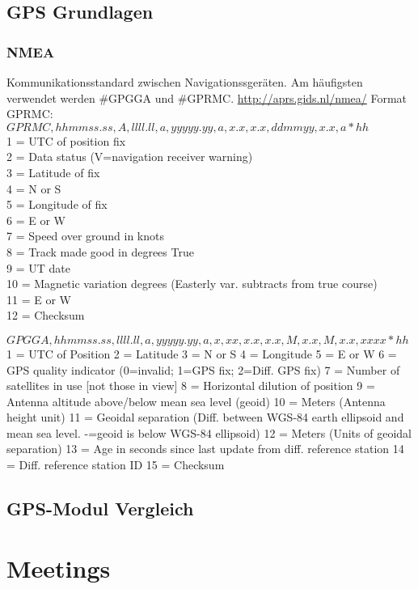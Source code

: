 \documentclass{article}
\begin{document}
\subsection{GPS Grundlagen}
\subsubsection{NMEA}

Kommunikationsstandard zwischen Navigationssgeräten. Am häufigsten verwendet werden $\#$GPGGA und $\#$GPRMC. \url{http://aprs.gids.nl/nmea/}
Format GPRMC:\\
$GPRMC,hhmmss.ss,A,llll.ll,a,yyyyy.yy,a,x.x,x.x,ddmmyy,x.x,a*hh$\\
1    = UTC of position fix\\
2    = Data status (V=navigation receiver warning)\\
3    = Latitude of fix\\
4    = N or S\\
5    = Longitude of fix\\
6    = E or W\\
7    = Speed over ground in knots\\
8    = Track made good in degrees True\\
9    = UT date\\
10   = Magnetic variation degrees (Easterly var. subtracts from true course)\\
11   = E or W\\
12   = Checksum



$GPGGA,hhmmss.ss,llll.ll,a,yyyyy.yy,a,x,xx,x.x,x.x,M,x.x,M,x.x,xxxx*hh$
1    = UTC of Position
2    = Latitude
3    = N or S
4    = Longitude
5    = E or W
6    = GPS quality indicator (0=invalid; 1=GPS fix; 2=Diff. GPS fix)
7    = Number of satellites in use [not those in view]
8    = Horizontal dilution of position
9    = Antenna altitude above/below mean sea level (geoid)
10   = Meters  (Antenna height unit)
11   = Geoidal separation (Diff. between WGS-84 earth ellipsoid and
       mean sea level.  -=geoid is below WGS-84 ellipsoid)
12   = Meters  (Units of geoidal separation)
13   = Age in seconds since last update from diff. reference station
14   = Diff. reference station ID
15   = Checksum


\subsection{GPS-Modul Vergleich}

\section{Meetings}
\end{document}
